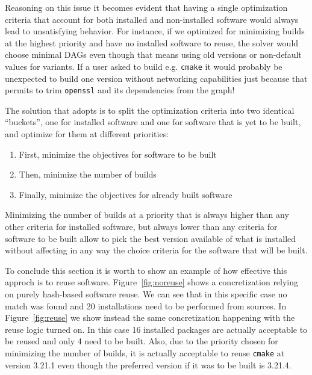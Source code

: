 Reasoning on this issue it becomes evident that having a single optimization criteria that account for both installed and non-installed software would always lead to unsatisfying behavior. For instance, if we optimized for minimizing builds at the highest priority and have no installed software to reuse, the solver would choose minimal DAGs even though that means using old versions or non-default values for variants. If a user asked to build e.g. \texttt{cmake} it would probably be unexpected to build one version without networking capabilities just because that permits to trim \texttt{openssl} and its dependencies from the graph!

The solution that \spack{} adopts is to split the optimization criteria into two identical ``buckets'', one for installed software and one for software that is yet to be built, and optimize for them at different priorities:
\begin{enumerate}
\item First, minimize the objectives for software to be built
\item Then, minimize the number of builds
\item Finally, minimize the objectives for already built software
\end{enumerate}
Minimizing the number of builds at a priority that is always higher than any other criteria for installed software, but always lower than any criteria for software to be built allow \spack{} to pick the best version available of what is installed without affecting in any way the choice criteria for the software that will be built. 

To conclude this section it is worth to show an example of how effective this approch is to reuse software. Figure~\ref{fig:noreuse} shows a concretization relying on purely hash-based software reuse. We can see that in this specific case no match was found and 20 installations need to be performed from sources. In Figure~\ref{fig:reuse} we show instead the same concretization happening with the reuse logic turned on. In this case 16 installed packages are actually acceptable to be reused and only 4 need to be built. Also, due to the priority chosen for minimizing the number of builds, it is actually acceptable to reuse \texttt{cmake} at version 3.21.1 even though the preferred version if it was to be built is 3.21.4.

